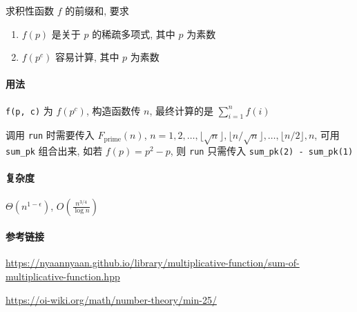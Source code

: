 求积性函数 \(f\) 的前缀和, 要求

\begin{enumerate}
    \item \(f(p)\) 是关于 \(p\) 的稀疏多项式, 其中 \(p\) 为素数
    \item \(f\left(p^c\right)\) 容易计算, 其中 \(p\) 为素数
\end{enumerate}

\paragraph{用法}

\verb|f(p, c)| 为 \(f\left(p^c\right)\), 构造函数传 \(n\), 最终计算的是 \(\sum_{i=1}^n f(i)\)

调用 \verb|run| 时需要传入 \(F_{\text{prime}}(n)\), \(n=1,2,\dots,\lfloor\sqrt{n}\rfloor,\lfloor n/\sqrt{n}\rfloor,\dots,\lfloor n/2\rfloor,n\), 可用 \verb|sum_pk| 组合出来, 如若 \(f(p)=p^2-p\), 则 \verb|run| 只需传入 \verb|sum_pk(2) - sum_pk(1)|

\paragraph{复杂度}

\(\Theta\left(n^{1-\epsilon}\right)\), \(O\left(\frac{n^{3/4}}{\log n}\right)\)

\paragraph{参考链接}

\url{https://nyaannyaan.github.io/library/multiplicative-function/sum-of-multiplicative-function.hpp}

\url{https://oi-wiki.org/math/number-theory/min-25/}
